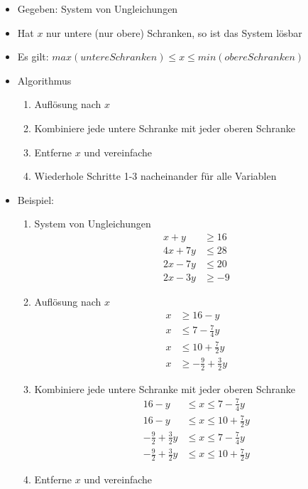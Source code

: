\documentclass{scrartcl}
\begin{document}
\begin{itemize}
	\item Gegeben: System von Ungleichungen
	\item Hat $ x $ nur untere (nur obere) Schranken, so ist das System lösbar
	\item Es gilt: $ max(untereSchranken) \leq x \leq min(obereSchranken) $
	\item Algorithmus
	\begin{enumerate}
		\item Auflösung nach $ x $
		\item Kombiniere jede untere Schranke mit jeder oberen Schranke
		\item Entferne $ x $ und vereinfache
		\item Wiederhole Schritte 1-3 nacheinander für alle Variablen
	\end{enumerate}
	\item Beispiel:
	\begin{enumerate}
		\item System von Ungleichungen
		\setcounter{equation}{0}
		\begin{align}
			x + y & \geq 16 \\
			4x + 7y & \leq 28 \\
			2x - 7y & \leq 20 \\
			2x - 3y & \geq -9 
		\end{align}
		\item Auflösung nach $ x $
		\setcounter{equation}{0}
		\begin{align}
			x & \geq 16 - y \\
			x & \leq 7 - \frac{7}{4} y \\
			x & \leq 10 + \frac{7}{2} y \\
			x & \geq -\frac{9}{2} + \frac{3}{2} y
		\end{align}
		\item Kombiniere jede untere Schranke mit jeder oberen Schranke
		\setcounter{equation}{0}
		\begin{align}
			16 - y & \leq x \leq 7 - \frac{7}{4}y \\
			16 - y & \leq x  \leq 10 + \frac{7}{2}y \\
			-\frac{9}{2} + \frac{3}{2} y & \leq x \leq 7 - \frac{7}{4}y \\
			-\frac{9}{2} + \frac{3}{2}y & \leq x \leq 10 + \frac{7}{2}y
		\end{align}
		\item Entferne $ x $ und vereinfache
		\setcounter{equation}{0}
		\begin{align}

\end{align}
\end{enumerate}
\end{itemize}
\end{document}
